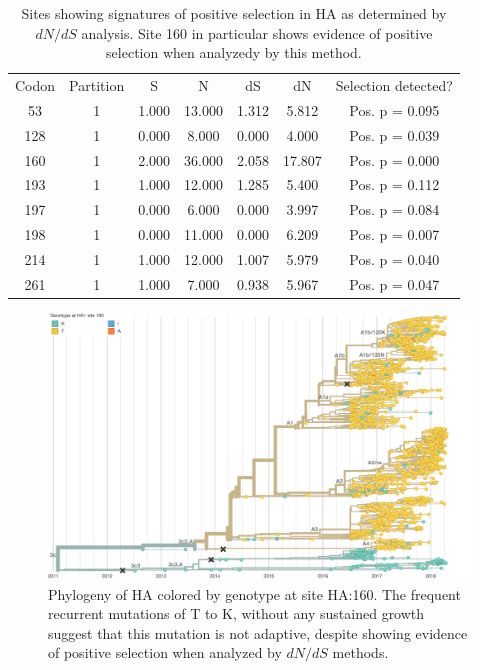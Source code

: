 \begin{table}[h]
  \caption{Sites showing signatures of positive selection in HA as determined by $dN/dS$ analysis. Site 160 in particular shows evidence of positive selection when analyzedy by this method.}
  \begin{center}
    \begin{tabular}{ccccccc}
    Codon & Partition & S     & N      & dS    & dN     & Selection detected? \\
    53    & 1         & 1.000 & 13.000 & 1.312 & 5.812  & Pos. p = 0.095      \\
    128   & 1         & 0.000 & 8.000  & 0.000 & 4.000  & Pos. p = 0.039      \\
    160   & 1         & 2.000 & 36.000 & 2.058 & 17.807 & Pos. p = 0.000      \\
    193   & 1         & 1.000 & 12.000 & 1.285 & 5.400  & Pos. p = 0.112      \\
    197   & 1         & 0.000 & 6.000  & 0.000 & 3.997  & Pos. p = 0.084      \\
    198   & 1         & 0.000 & 11.000 & 0.000 & 6.209  & Pos. p = 0.007      \\
    214   & 1         & 1.000 & 12.000 & 1.007 & 5.979  & Pos. p = 0.040      \\
    261   & 1         & 1.000 & 7.000  & 0.938 & 5.967  & Pos. p = 0.047
    \end{tabular}
  \end{center}
  \label{sup_tab:hyphy_results}
\end{table}

\clearpage

\begin{figure}[h]
    \begin{center}
    \includegraphics[width=.95\textwidth]{figures/ha1160_tree.png}
    \end{center}
    \caption{Phylogeny of HA colored by genotype at site HA:160. The frequent recurrent mutations of T to K, without any sustained growth suggest that this mutation is not adaptive, despite showing evidence of positive selection when analyzed by $dN/dS$ methods.}
    \label{sup_fig:ha1160}
\end{figure}

